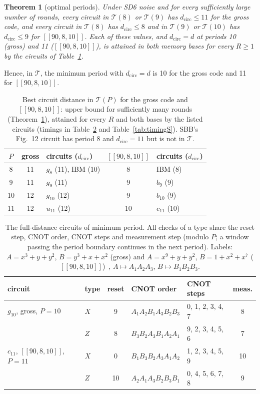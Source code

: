 \documentclass[aps,prl,twocolumn,superscriptaddress,nofootinbib]{revtex4-2}
\newif\ifshowclaimtags \showclaimtagsfalse
\newcommand{\cl}[1]{\ifshowclaimtags\textsuperscript{\textcolor{blue}{\scriptsize[#1]}}\fi}
\newcommand{\dcirc}{d_{\mathrm{circ}}}
\newcommand{\code}[1]{[[#1]]}
\newcommand{\T}{\mathcal{T}}
\newtheorem{theorem}{Theorem}
\begin{document}
\begin{theorem}[optimal periods]\label{thm:main}
Under SD6 noise and for every sufficiently large number of rounds, every circuit in
$\T(8)$ or $\T(9)$ has $\dcirc\le11$ for the gross code, and every circuit in $\T(8)$
has $\dcirc\le8$ and in $\T(9)$ or $\T(10)$ has $\dcirc\le9$ for $\code{90,8,10}$. Each of
these values, and $\dcirc=d$ at periods 10 (gross) and 11 ($\code{90,8,10}$), is attained
in both memory bases for every $R\ge1$ by the circuits of Table~\ref{tab:periods}.
\end{theorem}
\noindent Hence, in $\T$, the minimum period with $\dcirc=d$ is 10 for the gross code and
11 for $\code{90,8,10}$\cl{L-2,L-3,L-5,L-23}.

\begin{table}[t]
\caption{Best circuit distance in $\T(P)$ for the gross code and $\code{90,8,10}$: upper bound for sufficiently many rounds
(Theorem~\ref{thm:main}), attained for every $R$ and both bases by the listed circuits
(timings in Table~\ref{tab:timing} and Table~\ref{tab:timingS}). SBB's Fig.~12 circuit has period 8 and $\dcirc=11$
but is not in $\T$.}
\label{tab:periods}
\begin{ruledtabular}
\begin{tabular}{cclcl}
$P$ & gross & circuits ($\dcirc$) & $\code{90,8,10}$ & circuits ($\dcirc$)\\
\hline
8 & 11 & $g_8$ (11), IBM (10) & 8 & IBM (8)\\
9 & 11 & $g_9$ (11) & 9 & $b_9$ (9)\\
10 & 12 & $g_{10}$ (12) & 9 & $b_{10}$ (9)\\
11 & 12 & $u_{11}$ (12) & 10 & $c_{11}$ (10)\\
\end{tabular}
\end{ruledtabular}
\end{table}

\begin{table}[t]
\caption{The full-distance circuits of minimum period. All checks of a type share the
reset step, CNOT order, CNOT steps and measurement step (modulo $P$; a window passing the
period boundary continues in the next period). Labels: $A=x^3+y+y^2$, $B=y^3+x+x^2$
(gross) and $A=x^9+y+y^2$, $B=1+x^2+x^7$ ($\code{90,8,10}$)~\cite{Bravyi2024},
$A\mapsto A_1A_2A_3$, $B\mapsto B_1B_2B_3$.}
\label{tab:timing}
\begin{ruledtabular}
\begin{tabular}{llcllc}
circuit & type & reset & CNOT order & CNOT steps & meas.\\
\hline
$g_{10}$, gross, $P=10$ & $X$ & 9 & $A_1A_2B_1A_3B_2B_3$ & 0, 1, 2, 3, 4, 7 & 8\\
 & $Z$ & 8 & $B_3B_2A_3B_1A_2A_1$ & 9, 2, 3, 4, 5, 6 & 7\\
$c_{11}$, $\code{90,8,10}$, $P=11$ & $X$ & 0 & $B_1B_3B_2A_3A_1A_2$ & 1, 2, 3, 4, 5, 9 & 10\\
 & $Z$ & 10 & $A_2A_1A_3B_2B_3B_1$ & 0, 4, 5, 6, 7, 8 & 9\\
\end{tabular}
\end{ruledtabular}
\end{table}
\end{document}
